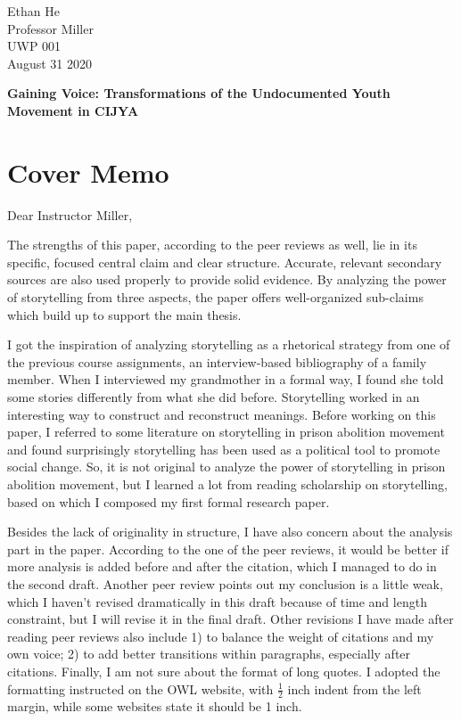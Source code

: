 \documentclass[12pt]{article}
\begin{document}
\begin{flushleft}

Ethan He \\
Professor Miller \\
UWP 001 \\
August 31 2020 \\

\begin{center}
    \textbf{Gaining Voice: Transformations of the Undocumented Youth Movement in CIJYA}
\end{center}

\setlength{\parindent}{0.5in}

\section*{Cover Memo}

\noindent
Dear Instructor Miller,

The strengths of this paper, according to the peer reviews as well, lie in its specific, focused central claim and clear structure. 
Accurate, relevant secondary sources are also used properly to provide solid evidence. 
By analyzing the power of storytelling from three aspects, the paper offers well-organized sub-claims which build up to support the main thesis.

I got the inspiration of analyzing storytelling as a rhetorical strategy from one of the previous course assignments, an interview-based bibliography of a family member. 
When I interviewed my grandmother in a formal way, I found she told some stories differently from what she did before. 
Storytelling worked in an interesting way to construct and reconstruct meanings. 
Before working on this paper, I referred to some literature on storytelling in prison abolition movement and found surprisingly storytelling has been used as a political tool to promote social change. 
So, it is not original to analyze the power of storytelling in prison abolition movement, but I learned a lot from reading scholarship on storytelling, based on which I composed my first formal research paper. 

Besides the lack of originality in structure, I have also concern about the analysis part in the paper. 
According to the one of the peer reviews, it would be better if more analysis is added before and after the citation, which I managed to do in the second draft. 
Another peer review points out my conclusion is a little weak, which I haven’t revised dramatically in this draft because of time and length constraint, but I will revise it in the final draft. 
Other revisions I have made after reading peer reviews also include
    1) to balance the weight of citations and my own voice; 
    2) to add better transitions within paragraphs, especially after citations. 
Finally, I am not sure about the format of long quotes. 
I adopted the formatting instructed on the OWL website, with $\frac{1}{2}$ inch indent from the left margin, while some websites state it should be 1 inch. 


\end{flushleft}
\end{document}
